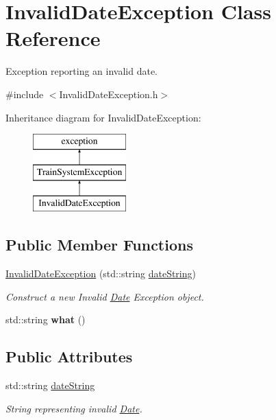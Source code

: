 \hypertarget{classInvalidDateException}{}\section{Invalid\+Date\+Exception Class Reference}
\label{classInvalidDateException}


Exception reporting an invalid date.  




{\ttfamily \#include $<$Invalid\+Date\+Exception.\+h$>$}

Inheritance diagram for Invalid\+Date\+Exception\+:\begin{figure}[H]
\begin{center}
\leavevmode
\includegraphics[height=3.000000cm]{classInvalidDateException}
\end{center}
\end{figure}
\subsection*{Public Member Functions}
\begin{DoxyCompactItemize}
\item 
\mbox{\hyperlink{classInvalidDateException_a0ae7a8a97c0442fc025cb63e3b86bee8}{Invalid\+Date\+Exception}} (std\+::string \mbox{\hyperlink{classInvalidDateException_a70664a8f1fe8853eed11199c5c0f0060}{date\+String}})
\begin{DoxyCompactList}\small\item\em Construct a new Invalid \mbox{\hyperlink{classDate}{Date}} Exception object. \end{DoxyCompactList}\item 
\mbox{\label{classInvalidDateException_a518618417b66ea59ef6d5a40aad7d045}} 
std\+::string {\bfseries what} ()
\end{DoxyCompactItemize}
\subsection*{Public Attributes}
\begin{DoxyCompactItemize}
\item 
\mbox{\label{classInvalidDateException_a70664a8f1fe8853eed11199c5c0f0060}} 
std\+::string \mbox{\hyperlink{classInvalidDateException_a70664a8f1fe8853eed11199c5c0f0060}{date\+String}}
\begin{DoxyCompactList}\small\item\em String representing invalid \mbox{\hyperlink{classDate}{Date}}. \end{DoxyCompactList}\end{DoxyCompactItemize}


